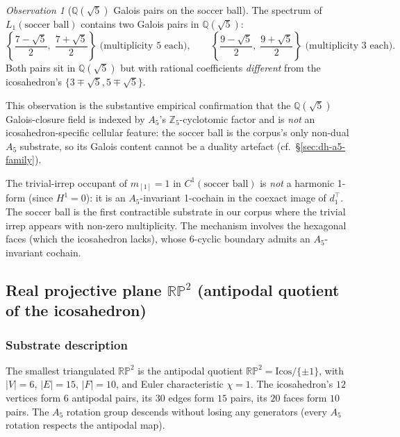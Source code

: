 \documentclass[12pt,a4paper]{article}
\theoremstyle{definition}
\theoremstyle{remark}
\newtheorem{observation}[theorem]{Observation}
\newcommand{\bZ}{\mathbb{Z}}
\newcommand{\bQ}{\mathbb{Q}}                %
\begin{document}
\begin{observation}[$\bQ(\sqrt 5)$ Galois pairs on the soccer ball]\label{obs:soccer-galois}
The spectrum of $L_1(\text{soccer ball})$ contains two Galois pairs in
$\bQ(\sqrt 5)$:
\[
  \left\{\frac{7 - \sqrt 5}{2},\; \frac{7 + \sqrt 5}{2}\right\}
  \text{ (multiplicity $5$ each)},
  \qquad
  \left\{\frac{9 - \sqrt 5}{2},\; \frac{9 + \sqrt 5}{2}\right\}
  \text{ (multiplicity $3$ each)}.
\]
Both pairs sit in $\bQ(\sqrt 5)$ but with rational coefficients
\emph{different} from the icosahedron's $\{3 \mp \sqrt 5, 5 \mp \sqrt 5\}$.
\end{observation}

This observation is the substantive empirical confirmation that the
$\bQ(\sqrt 5)$ Galois-closure field is indexed by $A_5$'s
$\bZ_5$-cyclotomic factor and is \emph{not} an icosahedron-specific
cellular feature: the soccer ball is the corpus's only non-dual $A_5$
substrate, so its Galois content cannot be a duality artefact
(cf.\ \S\ref{sec:dh-a5-family}).

The trivial-irrep occupant of $m_{[1]} = 1$ in $C^1(\text{soccer ball})$
is \emph{not} a harmonic 1-form (since $H^1 = 0$): it is an
$A_5$-invariant 1-cochain in the coexact image of $d_1^\top$. The
soccer ball is the first contractible substrate in our corpus where
the trivial irrep appears with non-zero multiplicity. The mechanism
involves the hexagonal faces (which the icosahedron lacks), whose
6-cyclic boundary admits an $A_5$-invariant cochain.

\subsection{Real projective plane $\mathbb{RP}^2$ (antipodal quotient of the icosahedron)}\label{sec:rp2}

\subsubsection{Substrate description}\label{sec:rp2-description}

The smallest triangulated $\mathbb{RP}^2$ is the antipodal quotient
$\mathbb{RP}^2 = \text{Icos}/\{\pm 1\}$, with $|V| = 6$, $|E| = 15$,
$|F| = 10$, and Euler characteristic $\chi = 1$. The icosahedron's
$12$ vertices form $6$ antipodal pairs, its $30$ edges form $15$
pairs, its $20$ faces form $10$ pairs. The $A_5$ rotation group
descends without losing any generators (every $A_5$ rotation respects
the antipodal map).
\end{document}
